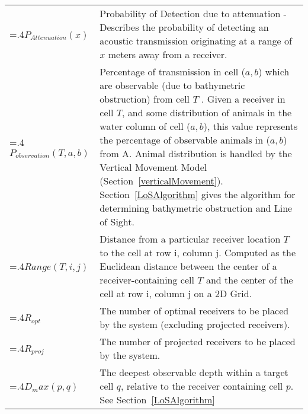 \begin{tabularx}{\linewidth}{@{}>{\hsize=.4\hsize}X>{\hsize=1.5\hsize}X@{}}
	$P_{Attenuation}(x)$ & Probability of Detection due to attenuation - Describes the probability of detecting an acoustic transmission originating at a range of $x$ meters away from a receiver.\\

	$P_{observation}(T,a,b)$ & Percentage of transmission in cell ($a,b$) which are observable (due to bathymetric obstruction) from cell $T$ .  Given a receiver in cell $T$, and some distribution of animals in the water column of cell ($a,b$), this value represents the percentage of observable animals in ($a,b$) from A.  Animal distribution is handled by the Vertical Movement Model (Section~\ref{verticalMovement}).  Section~\ref{LoSAlgorithm} gives the algorithm for determining bathymetric obstruction and Line of Sight.\\
	
	$Range(T,i,j)$ &  Distance from a particular receiver location $T$ to the cell at row i, column j.  Computed as the Euclidean distance between the center of a receiver-containing cell $T$ and the center of the cell at row i, column j on a 2D Grid.\\
	
	$R_{opt}$ & The number of optimal receivers to be placed by the system (excluding projected receivers). \\
	
	$R_{proj}$ & The number of projected receivers to be placed by the system.\\
	
	$D_max(p, q)$& The deepest observable depth within a target cell $q$, relative to the receiver containing cell $p$. See Section~\ref{LoSAlgorithm}\\
	



\end{tabularx}

